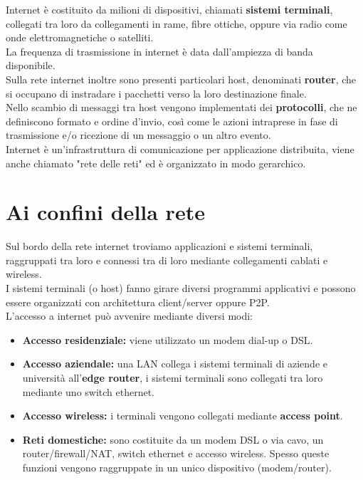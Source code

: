 \documentclass{report}
\begin{document}
	Internet è costituito da milioni di dispositivi, chiamati \textbf{sistemi terminali}, collegati tra loro da collegamenti in rame, fibre ottiche, oppure via radio come onde elettromagnetiche o satelliti.
	\medskip\\
	La frequenza di trasmissione in internet è data dall'ampiezza di banda disponibile.
	\medskip\\Sulla rete internet inoltre sono presenti particolari host, denominati \textbf{router}, che si occupano di instradare i pacchetti verso la loro destinazione finale.
	\medskip\\Nello scambio di messaggi tra host vengono implementati dei \textbf{protocolli}, che ne definiscono formato e ordine d'invio, così come le azioni intraprese in fase di trasmissione e/o ricezione di un messaggio o un altro evento.
	\medskip\\Internet è un'infrastruttura di comunicazione per applicazione distribuita, viene anche chiamato "rete delle reti" ed è organizzato in modo gerarchico.
	\section{Ai confini della rete}
	Sul bordo della rete internet troviamo applicazioni e sistemi terminali, raggruppati tra loro e connessi tra di loro mediante collegamenti cablati e wireless.
	\medskip\\I sistemi terminali (o host) fanno girare diversi programmi applicativi e possono essere organizzati con architettura client/server oppure P2P.
	\medskip\\L'accesso a internet può avvenire mediante diversi modi:
	\begin{itemize}
		\item \textbf{Accesso residenziale:} viene utilizzato un modem dial-up o DSL.
		\item \textbf{Accesso aziendale:} una LAN collega i sistemi terminali di aziende e università all'\textbf{edge router}, i sistemi terminali sono collegati tra loro mediante uno switch ethernet.
		\item \textbf{Accesso wireless:} i terminali vengono collegati mediante \textbf{access point}.
		\item \textbf{Reti domestiche:} sono costituite da un modem DSL o via cavo, un router/firewall/NAT, switch ethernet e accesso wireless. Spesso queste funzioni vengono raggruppate in un unico dispositivo (modem/router).
	\end{itemize}
\end{document}
